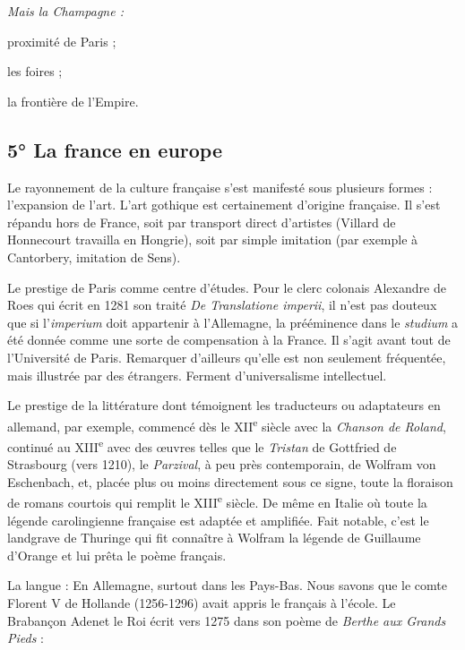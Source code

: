 \documentclass[french,twoside]{book} %
\newlength{\listmod}
\newcommand{\listhead}[1]{\hspace{-1\listmod}\emph{#1}}
\def\bignobreak{\ifdim\lastskip<\bigskipamount
  \removelastskip\nopagebreak\bigskip\fi}
\newcommand{\labelblock}[1]{\bigskip{\color{rubric}\bfseries\centering #1\par}\bignobreak}
\begin{document}
\begin{listalpha}[itemsep=0pt,]
\item[]\listhead{Mais la Champagne :}
\item proximité de Paris ;
\item les foires ;
\item la frontière de l’Empire.

\end{listalpha}\subsection[5° La france en europe]{5° La france en europe}
\label{c03c5}

\labelblock{— Aspect culturel.}

\noindent Le rayonnement de la culture française s’est manifesté sous plusieurs formes : l’expansion de l’art. L’art gothique est certainement d’origine française. Il s’est répandu hors de France, soit par transport direct d’artistes (Villard de Honnecourt travailla en Hongrie), soit par simple imitation (par exemple à Cantorbery, imitation de Sens).\par
Le prestige de Paris comme centre d’études. Pour le clerc colonais Alexandre de Roes qui écrit en 1281 son traité {\itshape De Translatione imperii}, il n’est pas douteux que si l’{\itshape imperium} doit appartenir à l’Allemagne, la prééminence dans le {\itshape studium} a été donnée comme une sorte de compensation à la France. Il s’agit avant tout de l’Université de Paris. Remarquer d’ailleurs qu’elle est non seulement fréquentée, mais illustrée par des étrangers. Ferment d’universalisme intellectuel.\par
Le prestige de la littérature dont témoignent les traducteurs ou adaptateurs en allemand, par exemple, commencé dès le XII\textsuperscript{e} siècle avec la {\itshape Chanson de Roland}, continué au XIII\textsuperscript{e} avec des œuvres telles que le {\itshape Tristan} de Gottfried de Strasbourg (vers 1210), le {\itshape Parzival}, à peu près contemporain, de Wolfram von Eschenbach, et, placée plus ou moins directement sous ce signe, toute la floraison de romans courtois qui remplit le XIII\textsuperscript{e} siècle. De même en Italie où toute la légende carolingienne française est adaptée et amplifiée. Fait notable, c’est le landgrave de Thuringe qui fit connaître à Wolfram la légende de Guillaume d’Orange et lui prêta le poème français.\par
La langue : En Allemagne, surtout dans les Pays-Bas. Nous savons que le comte Florent V de Hollande (1256-1296) avait appris le français à l’école. Le Brabançon Adenet le Roi écrit vers 1275 dans son poème de {\itshape Berthe aux Grands Pieds} :\par
\end{document}
